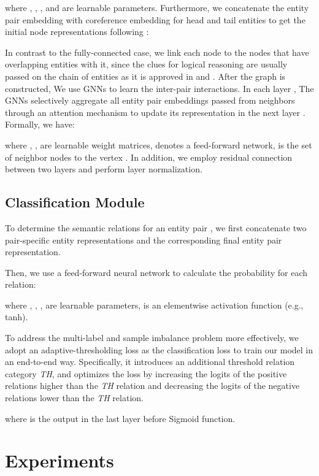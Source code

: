 \documentclass[11pt]{article}
\begin{document}
where , , ,  and  are learnable parameters. 
Furthermore, we concatenate the entity pair embedding with coreference embedding for head and tail entities to get the initial node representations following \citet{yao-etal-2019-docred}:


In contrast to the fully-connected case, we link each node to the nodes that have overlapping entities with it, since the clues for logical reasoning are usually passed on the chain of entities as it is approved in \citet{xu-etal-2021-discriminative} and \citet{zeng-etal-2021-sire}.
After the graph is constructed, We use GNNs to learn the inter-pair interactions.
In each layer , The GNNs selectively aggregate all entity pair embeddings passed from neighbors through an attention mechanism to update its representation in the next layer .
Formally, we have:

where , ,  are learnable weight matrices,  denotes a feed-forward network,  is the set of neighbor nodes to the vertex .
In addition, we employ residual connection between two layers and perform layer normalization.
\subsection{Classification Module}


To determine the semantic relations for an entity pair , we first concatenate two pair-specific entity representations and the corresponding final entity pair representation.

Then, we use a feed-forward neural network to calculate the probability for each relation:

where , , ,  are learnable parameters,  is an elementwise activation function (e.g., tanh).

To address the multi-label and sample imbalance problem more effectively, we adopt an adaptive-thresholding loss \citep{DBLP:conf/aaai/Zhou0M021} as the classification loss to train our model in an end-to-end way.
Specifically, it introduces an additional threshold relation category \textit{TH}, and optimizes the loss by increasing the logits of the positive relations  higher than the \textit{TH} relation and decreasing the logits of the negative relations  lower than the \textit{TH} relation.

where  is the output in the last layer before Sigmoid function.

\section{Experiments}
\end{document}
